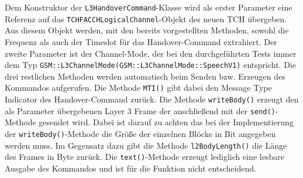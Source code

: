 Dem Konstruktor der \lstinline{L3HandoverCommand}-Klasse wird als erster Parameter eine Referenz auf das \lstinline{TCHFACCHLogicalChannel}-Objekt des neuen TCH übergeben. Aus diesem Objekt werden, mit den bereits vorgestellten Methoden, sowohl die Frequenz als auch der Timeslot für das Handover-Command extrahiert. Der zweite Parameter ist der Channel-Mode, der bei den durchgeführten Tests immer dem Typ \lstinline{GSM::L3ChannelMode(GSM::L3ChannelMode::SpeechV1)} entspricht. Die drei restlichen Methoden werden automatisch beim Senden bzw. Erzeugen des Kommandos aufgerufen. Die Methode \lstinline{MTI()} gibt dabei den Message Type Indicator des Handover-Command zurück. Die Methode \lstinline{writeBody()} erzeugt den als Parameter übergebenen Layer 3 Frame der anschließend mit der \lstinline{send()}-Methode gesendet wird. Dabei ist darauf zu achten das bei der Implementierung der \lstinline{writeBody()}-Methode die Größe der einzelnen Blöcke in Bit angegeben werden muss. Im Gegensatz dazu gibt die Methode \lstinline{l2BodyLength()} die Länge des Frames in Byte zurück. Die \lstinline{text()}-Methode erzeugt lediglich eine lesbare Ausgabe des Kommandos und ist für die Funktion nicht entscheidend.

